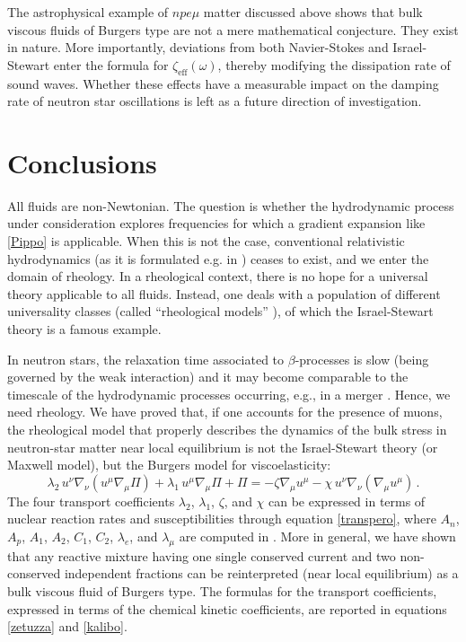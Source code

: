 \documentclass[a4paper, amsfonts, amssymb, amsmath, reprint, showkeys, nofootinbib, twoside, onecolumn,notitlepage]{revtex4-1}
\begin{document}
The astrophysical example of $npe\mu$ matter discussed above shows that bulk viscous fluids of Burgers type are not a mere mathematical conjecture. They exist in nature. More importantly, deviations from both Navier-Stokes and Israel-Stewart enter the formula for $\zeta_{\text{eff}}(\omega)$, thereby modifying the dissipation rate of sound waves. Whether these effects have a measurable impact on the damping rate of neutron star oscillations is left as a future direction of investigation.


\section{Conclusions}

All fluids are non-Newtonian. The question is whether the hydrodynamic process under consideration explores frequencies for which a gradient expansion like \eqref{Pippo} is applicable. When this is not the case, conventional relativistic hydrodynamics (as it is formulated e.g. in \cite{Romatschke2017}) ceases to exist, and we enter the domain of rheology. In a rheological context, there is no hope for a universal theory applicable to all fluids. Instead, one deals with a population of different universality classes \cite{GavassinoUniversalityI2023} (called ``rheological models''  \cite{Malkin_book}), of which the Israel-Stewart theory \cite{Israel_Stewart_1979} is a famous example.

In neutron stars, the relaxation time associated to $\beta$-processes is slow \cite{Sawyer_Bulk1989} (being governed by the weak interaction) and it may become comparable to the timescale of the hydrodynamic processes occurring, e.g., in a merger \cite{AlfordRezzolla,MostHaber2022}. Hence, we need rheology. We have proved that, if one accounts for the presence of muons, the rheological model that properly describes the dynamics of the bulk stress in neutron-star matter near local equilibrium is not the Israel-Stewart theory (or Maxwell model), but the Burgers model for viscoelasticity:
\begin{equation}\label{lamb2}
\lambda_2 \, u^\nu \nabla_\nu (u^\mu \nabla_\mu \Pi) + \lambda_1 \, u^\mu \nabla_\mu \Pi+  \Pi = -\zeta  \nabla_\mu  u^\mu -\chi\, u^\nu \nabla_\nu  (\nabla_\mu  u^\mu) \, .
\end{equation}
The four transport coefficients $\lambda_2$, $\lambda_1$, $\zeta$, and $\chi$ can be expressed in terms of nuclear reaction rates and susceptibilities through equation \eqref{transpero}, where $A_n$, $A_p$, $A_1$, $A_2$, $C_1$, $C_2$, $\lambda_e$, and $\lambda_\mu$ are computed in \cite{AlfordMuons2021,AlfordMuons2022}. More in general, we have shown that any reactive mixture having one single conserved current and two non-conserved independent fractions can be reinterpreted (near local equilibrium) as a bulk viscous fluid of Burgers type. The  formulas for the transport coefficients, expressed in terms of the chemical kinetic coefficients, are reported in equations \eqref{zetuzza} and \eqref{kalibo}.
\end{document}
